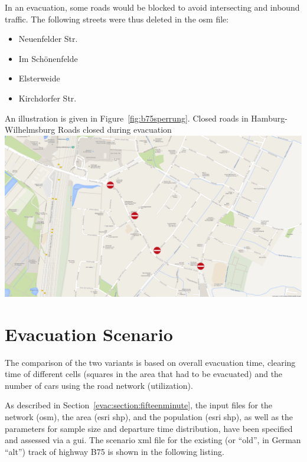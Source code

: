 In an evacuation, some roads would be blocked to avoid intersecting and inbound traffic. The following streets were thus deleted in the \gls{osm} file:
%
\begin{itemize}\styleItemize
	\item Neuenfelder Str. 
	\item Im Schönenfelde
	\item Elsterweide
	\item Kirchdorfer Str.
\end{itemize}
%
An illustration is given in Figure~\ref{fig:b75sperrung}.
%
%
\createfigure%
{Closed roads in Hamburg-Wilhelmsburg}%
{Roads closed during evacuation}%
{\label{fig:b75sperrung}}%
{\includegraphics[width=0.7\linewidth]{scenarios/figures/B75sperrung}}%
{}

\section{Evacuation Scenario}
The comparison of the two variants is based on overall evacuation time, clearing time of different cells (squares in the area that had to be evacuated) and the number of cars using the road network (utilization).

As described in Section~\ref{evac:section:fifteenminute}, the input files for the network (\gls{osm}), the area (\gls{esri} shp), and the population (\gls{esri} shp), as well as the parameters for sample size and departure time distribution, have been specified and assessed via a \gls{gui}. The scenario \gls{xml} file for the existing (or ``old'', in German ``alt'') track of highway B75 is shown in the following listing. 



